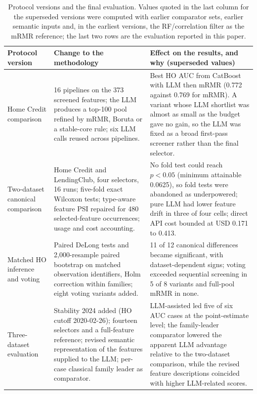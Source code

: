 \documentclass[final,5p,twocolumn]{elsarticle}
\begin{document}
\begin{table}[htbp]
\centering
\footnotesize
\setlength{\tabcolsep}{5pt}
\begin{threeparttable}
\caption{Protocol versions and the final evaluation. Values quoted in the last column for the superseded versions were computed with earlier comparator sets, earlier semantic inputs and, in the earliest versions, the RF/correlation filter as the mRMR reference; the last two rows are the evaluation reported in this paper.}
\label{tab:stages}
\begin{tabular}{@{}L{27mm}L{\dimexpr(\textwidth-27mm-4\tabcolsep)/2\relax}L{\dimexpr(\textwidth-27mm-4\tabcolsep)/2\relax}@{}}
\toprule
Protocol version & Change to the methodology & Effect on the results, and why (superseded values) \\
\midrule
Home Credit comparison & 16 pipelines on the 373 screened features; the LLM produces a top-100 pool refined by mRMR, Boruta or a stable-core rule; six LLM calls reused across pipelines. & Best HO AUC from CatBoost with LLM then mRMR (0.772 against 0.769 for mRMR). A variant whose LLM shortlist was almost as small as the budget gave no gain, so the LLM was fixed as a broad first-pass screener rather than the final selector. \\
\addlinespace
Two-dataset canonical comparison & Home Credit and LendingClub, four selectors, 16 runs; five-fold exact Wilcoxon tests; type-aware feature PSI repaired for 480 selected-feature occurrences; usage and cost accounting. & No fold test could reach $p<0.05$ (minimum attainable 0.0625), so fold tests were abandoned as underpowered; pure LLM had lower feature drift in three of four cells; direct API cost bounded at USD 0.171 to 0.413. \\
\addlinespace
Matched HO inference and voting & Paired DeLong tests and 2,000-resample paired bootstrap on matched observation identifiers, Holm correction within families; eight voting variants added. & 11 of 12 canonical differences became significant, with dataset-dependent signs; voting exceeded sequential screening in 5 of 8 variants and full-pool mRMR in none. \\
\addlinespace
Three-dataset evaluation & Stability 2024 added (HO cutoff 2020-02-26); fourteen selectors and a full-feature reference; revised semantic representation of the features supplied to the LLM; per-case classical family leader as comparator. & LLM-assisted led five of six AUC cases at the point-estimate level; the family-leader comparator lowered the apparent LLM advantage relative to the two-dataset comparison, while the revised feature descriptions coincided with higher LLM-related scores. \\

\end{tabular}
\end{threeparttable}
\end{table}
\end{document}
